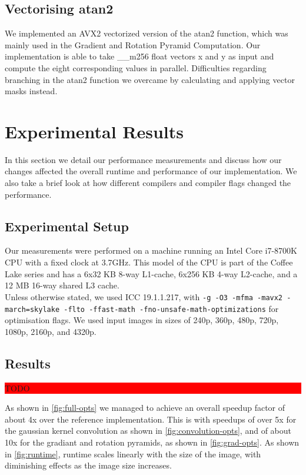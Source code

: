 \documentclass[letterpaper]{article}
\begin{document}
\subsection*{Vectorising atan2}
We implemented an AVX2 vectorized version of the atan2 function, which was mainly used in the Gradient and Rotation Pyramid Computation. Our implementation is able to take \_\_m256 float vectors x and y as input and compute the eight corresponding values in parallel. Difficulties regarding branching in the atan2 function we overcame by calculating and applying vector masks instead.

\section{Experimental Results}\label{sec:results}
In this section we detail our performance measurements and discuss how our changes affected the overall runtime and performance of our implementation. We also take a brief look at how different compilers and compiler flags changed the performance.

\subsection*{Experimental Setup}
Our measurements were performed on a machine running an Intel Core i7-8700K CPU with a fixed clock at 3.7GHz. This model of the CPU is part of the Coffee Lake series and has a 6x32 KB 8-way L1-cache, 6x256 KB 4-way L2-cache, and a 12 MB 16-way shared L3 cache. \\

Unless otherwise stated, we used ICC 19.1.1.217, with \texttt{-g -O3 -mfma -mavx2 -march=skylake -flto -ffast-math -fno-unsafe-math-optimizations} for optimisation flags. We used input images in sizes of 240p, 360p, 480p, 720p, 1080p, 2160p, and 4320p.

\subsection*{Results}
\colorbox{red}{\parbox{0.45\textwidth}{TODO}}
As shown in \autoref{fig:full-opts} we managed to achieve an overall speedup factor of about 4x over the reference implementation. This is with speedups of over 5x for the gaussian kernel convolution as shown in \autoref{fig:convolution-opts}, and of about 10x for the gradiant and rotation pyramids, as shown in \autoref{fig:grad-opts}. As shown in \autoref{fig:runtime}, runtime scales linearly with the size of the image, with diminishing effects as the image size increases. \\
\end{document}
